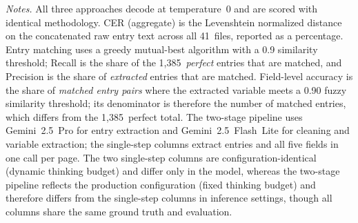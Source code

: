 \begin{table}[t]
\begin{tablenotes}
\item \textit{Notes.} All three approaches decode at temperature~$0$ and are scored with identical methodology. CER (aggregate) is the Levenshtein normalized distance on the concatenated raw entry text across all 41~files, reported as a percentage. Entry matching uses a greedy mutual-best algorithm with a 0.9 similarity threshold; Recall is the share of the 1{,}385~\textit{perfect} entries that are matched, and Precision is the share of \textit{extracted} entries that are matched. Field-level accuracy is the share of \textit{matched entry pairs} where the extracted variable meets a 0.90 fuzzy similarity threshold; its denominator is therefore the number of matched entries, which differs from the 1{,}385~perfect total. The two-stage pipeline uses Gemini~2.5~Pro for entry extraction and Gemini~2.5~Flash~Lite for cleaning and variable extraction; the single-step columns extract entries and all five fields in one call per page. The two single-step columns are configuration-identical (dynamic thinking budget) and differ only in the model, whereas the two-stage pipeline reflects the production configuration (fixed thinking budget) and therefore differs from the single-step columns in inference settings, though all columns share the same ground truth and evaluation.
\end{tablenotes}
\end{table}
